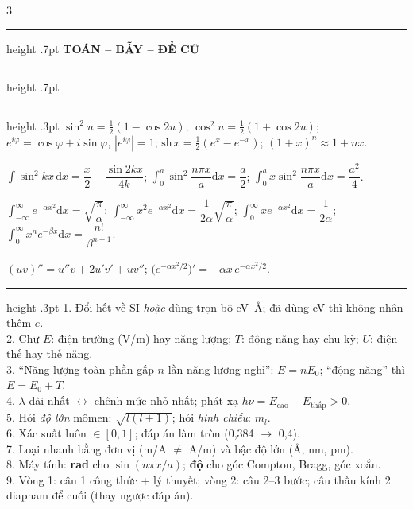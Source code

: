 \documentclass[10pt,a4paper]{article}
\newcommand{\chap}[1]{\par\vspace{2.6pt}\hrule height .7pt\vspace{1.3pt}%
  {\bfseries\fontsize{8}{8.8}\selectfont #1}\par\vspace{.8pt}\hrule height .7pt\vspace{1.6pt}}
\newcommand{\sect}[1]{\par\vspace{2pt}{\bfseries #1}\par\vspace{-.4pt}\hrule height .3pt\vspace{1.3pt}}
\newcommand{\dd}{\mathrm d}
\begin{document}
\begin{multicols*}{3}
\chap{TOÁN -- BẪY -- ĐỀ CŨ}

\sect{T. Toán hay dùng}
$\sin^2u=\tfrac12(1-\cos2u)$; $\cos^2u=\tfrac12(1+\cos2u)$; $e^{i\varphi}=\cos\varphi+i\sin\varphi$, $|e^{i\varphi}|=1$; $\mathrm{sh}\,x=\tfrac12(e^x-e^{-x})$; $(1+x)^n\approx1+nx$.

$\displaystyle\int\!\sin^2kx\,\dd x=\dfrac x2-\dfrac{\sin2kx}{4k}$; $\displaystyle\int_0^a\!\sin^2\dfrac{n\pi x}a\dd x=\dfrac a2$; $\displaystyle\int_0^a\!x\sin^2\dfrac{n\pi x}a\dd x=\dfrac{a^2}4$.

$\displaystyle\int_{-\infty}^{\infty}\!e^{-\alpha x^2}\dd x=\sqrt{\dfrac\pi\alpha}$; $\displaystyle\int_{-\infty}^{\infty}\!x^2e^{-\alpha x^2}\dd x=\dfrac1{2\alpha}\sqrt{\dfrac\pi\alpha}$; $\displaystyle\int_0^\infty\!xe^{-\alpha x^2}\dd x=\dfrac1{2\alpha}$; $\displaystyle\int_0^\infty\!x^ne^{-\beta x}\dd x=\dfrac{n!}{\beta^{n+1}}$.

$(uv)''=u''v+2u'v'+uv''$; $\big(e^{-\alpha x^2/2}\big)'=-\alpha x\,e^{-\alpha x^2/2}$.

\sect{B. Bẫy và cách làm bài}
1. Đổi hết về SI \emph{hoặc} dùng trọn bộ eV--Å; đã dùng eV thì không nhân thêm $e$.\\
2. Chữ $E$: điện trường (V/m) hay năng lượng; $T$: động năng hay chu kỳ; $U$: điện thế hay thế năng.\\
3. ``Năng lượng toàn phần gấp $n$ lần năng lượng nghỉ'': $E=nE_0$; ``động năng'' thì $E=E_0+T$.\\
4. $\lambda$ dài nhất $\leftrightarrow$ chênh mức nhỏ nhất; phát xạ $h\nu=E_{\text{cao}}-E_{\text{thấp}}>0$.\\
5. Hỏi \emph{độ lớn} mômen: $\sqrt{l(l+1)}$; hỏi \emph{hình chiếu}: $m_l$.\\
6. Xác suất luôn $\in[0,1]$; đáp án làm tròn (0,384 $\to$ 0,4).\\
7. Loại nhanh bằng đơn vị (m/A $\ne$ A/m) và bậc độ lớn (Å, nm, pm).\\
8. Máy tính: \textbf{rad} cho $\sin(n\pi x/a)$; \textbf{độ} cho góc Compton, Bragg, góc xoắn.\\
9. Vòng 1: câu 1 công thức + lý thuyết; vòng 2: câu 2--3 bước; câu thấu kính 2 diapham để cuối (thay ngược đáp án).


\end{multicols*}
\end{document}
